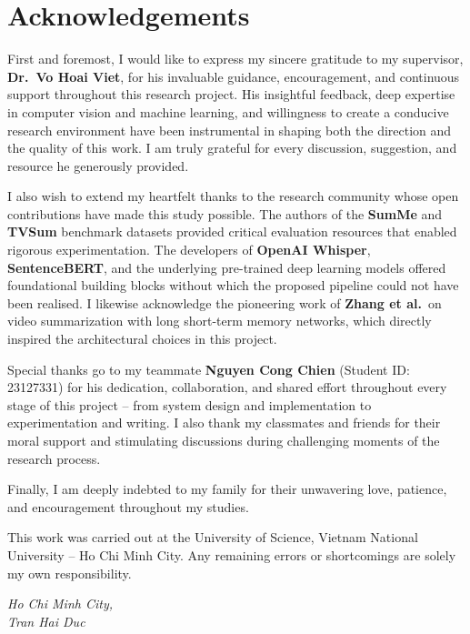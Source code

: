 \documentclass[12pt, a4paper]{report}
\begin{document}
\chapter*{Acknowledgements}
\thispagestyle{fancy}

First and foremost, I would like to express my sincere gratitude to my supervisor,
\textbf{Dr.\ Vo Hoai Viet}, for his invaluable guidance, encouragement, and continuous
support throughout this research project. His insightful feedback, deep expertise in
computer vision and machine learning, and willingness to create a conducive research
environment have been instrumental in shaping both the direction and the quality of
this work. I am truly grateful for every discussion, suggestion, and resource he
generously provided.

I also wish to extend my heartfelt thanks to the research community whose open
contributions have made this study possible. The authors of the \textbf{SumMe} and
\textbf{TVSum} benchmark datasets provided critical evaluation resources that enabled
rigorous experimentation. The developers of \textbf{OpenAI Whisper}, \textbf{SentenceBERT},
and the underlying pre-trained deep learning models offered foundational building blocks
without which the proposed pipeline could not have been realised. I likewise acknowledge
the pioneering work of \textbf{Zhang et al.}\ on video summarization with long
short-term memory networks, which directly inspired the architectural choices in this
project.

Special thanks go to my teammate \textbf{Nguyen Cong Chien} (Student ID: 23127331)
for his dedication, collaboration, and shared effort throughout every stage of this
project -- from system design and implementation to experimentation and writing.
I also thank my classmates and friends for their moral support and stimulating
discussions during challenging moments of the research process.

Finally, I am deeply indebted to my family for their unwavering love, patience, and
encouragement throughout my studies.

This work was carried out at the University of Science, Vietnam National University --
Ho Chi Minh City. Any remaining errors or shortcomings are solely my own responsibility.

\vspace{1.5cm}
\begin{flushright}
  \textit{Ho Chi Minh City, \the\year}\\[6pt]
  \textit{Tran Hai Duc}
\end{flushright}
\end{document}
